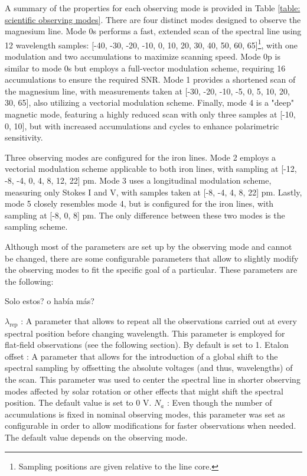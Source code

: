 A summary of the properties for each observing mode is provided in Table \ref{table: scientific observing modes}. There are four distinct modes designed to observe the magnesium line. Mode 0s performs a fast, extended scan of the spectral line using 12 wavelength samples: [-40, -30, -20, -10, 0, 10, 20, 30, 40, 50, 60, 65]\footnote{Sampling positions are given relative to the line core.}, with one modulation and two accumulations to maximize scanning speed. Mode 0p is similar to mode 0s but employs a full-vector modulation scheme, requiring 16 accumulations to ensure the required SNR. Mode 1 provides a shortened scan of the magnesium line, with measurements taken at [-30, -20, -10, -5, 0, 5, 10, 20, 30, 65], also utilizing a vectorial modulation scheme. Finally, mode 4 is a "deep" magnetic mode, featuring a highly reduced scan with only three samples at [-10, 0, 10], but with increased accumulations and cycles to enhance polarimetric sensitivity. 

Three observing modes are configured for the iron lines. Mode 2 employs a vectorial modulation scheme applicable to both iron lines, with sampling at [-12, -8, -4, 0, 4, 8, 12, 22] pm. Mode 3 uses a longitudinal modulation scheme, measuring only Stokes I and V, with samples taken at [-8, -4, 4, 8, 22] pm. Lastly, mode 5 closely resembles mode 4, but is configured for the iron lines, with sampling at [-8, 0, 8] pm. The only difference between these two modes is the sampling scheme.

Although most of the parameters are set up by the observing mode and cannot be changed, there are some configurable parameters that allow to slightly modify the observing modes to fit the specific goal of a particular. These parameters are the following:

Solo estos? o había más? 
\begin{itemize}
    \Myitem $\lambda _ {\text{rep}}$ : A parameter that allows to repeat all the observations carried out at every spectral position before changing wavelength. This parameter is employed for flat-field observations (see the following section). By default is set to 1.
    \Myitem Etalon offset : A parameter that allows for the introduction of a global shift to the spectral sampling by offsetting the absolute voltages (and thus, wavelengths) of the scan. This parameter was used to center the spectral line in shorter observing modes affected by solar rotation or other effects that might shift the spectral position. The default value is set to 0 V.
    \Myitem $N_a$ : Even though the number of accumulations is fixed in nominal observing modes, this parameter was set as configurable in order to allow modifications for faster observations when needed. The  default value depends on the observing mode.  
\end{itemize}



